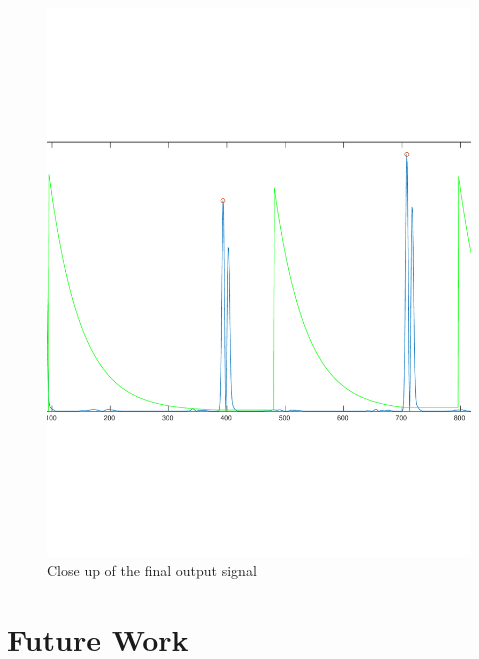 \documentclass{article}
\begin{document}
\begin{figure}%
        \centering
        \includegraphics[scale=0.4]{./figs/rivas_closeup.pdf}
        \caption{Close up of the final output signal}
        \label{fig:rivasclose}
\end{figure}

\section{Future Work} %




\end{document}
